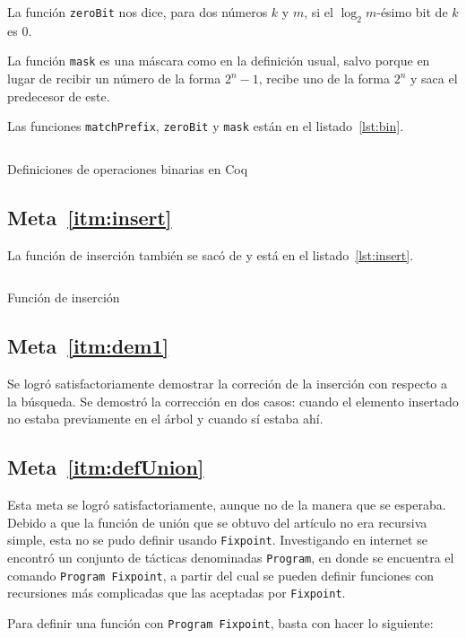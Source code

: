 \documentclass[11pt,letterpaper]{article}
\begin{document}
La función \texttt{zeroBit} nos dice, para dos números $k$ y $m$, si el $\log_2m$-ésimo bit de $k$ es $0$.

La función \texttt{mask} es una máscara como en la definición usual, salvo porque en lugar de recibir un número de la forma $2^n-1$, recibe uno de la forma $2^n$ y saca el predecesor de este.

Las funciones \texttt{matchPrefix}, \texttt{zeroBit} y \texttt{mask} están en el listado~\ref{lst:bin}.

\begin{listing}[H]
  \inputminted{coq}{src/bin.v}
  \caption{Definiciones de operaciones binarias en Coq}
  \label{lst:bin}
\end{listing}

\subsection{Meta~\ref{itm:insert}}
\noindent La función de inserción también se sacó de\cite{} y está en el listado~\ref{lst:insert}. 

\begin{listing}[H]
  \inputminted{coq}{src/insert.v}
  \caption{Función de inserción}
  \label{lst:insert}
\end{listing}

\subsection{Meta~\ref{itm:dem1}}
\noindent Se logró satisfactoriamente demostrar la correción de la inserción con respecto a la búsqueda. Se demostró la corrección en dos casos: cuando el elemento insertado no estaba previamente en el árbol y cuando sí estaba ahí.

\subsection{Meta~\ref{itm:defUnion}}
\noindent Esta meta se logró satisfactoriamente, aunque no de la manera que se esperaba. Debido a que la función de unión que se obtuvo del artículo no era recursiva simple, esta no se pudo definir usando \texttt{Fixpoint}. Investigando en internet se encontró un conjunto de tácticas denominadas \texttt{Program}\cite{}, en donde se encuentra el comando \texttt{Program Fixpoint}, a partir del cual se pueden definir funciones con recursiones más complicadas que las aceptadas por \texttt{Fixpoint}.

Para definir una función con \texttt{Program Fixpoint}, basta con hacer lo siguiente:
\end{document}
